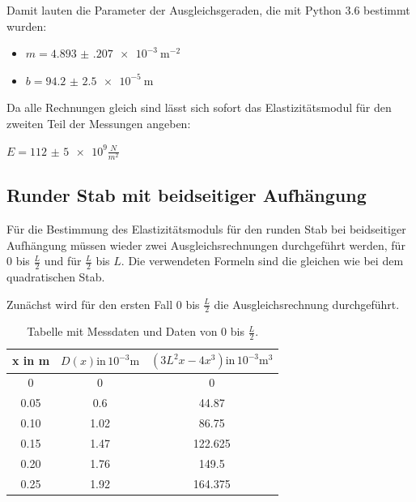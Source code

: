 Damit lauten die Parameter der Ausgleichsgeraden, die mit Python 3.6 bestimmt wurden:

\begin{itemize}
  \item $m = \SI{4.893(207)e-3}{\meter\tothe{-2}}$
  \item $b = \SI{94.2(25)e-5}{\meter}$
\end{itemize}


Da alle Rechnungen gleich sind lässt sich sofort das Elastizitätsmodul für den
zweiten Teil der Messungen angeben:\\

\centerline{$E = \num{112(5)e9} \frac{N}{m^2}$}


\subsection{Runder Stab mit beidseitiger Aufhängung}

Für die Bestimmung des Elastizitätsmoduls für den runden Stab bei beidseitiger
Aufhängung müssen wieder zwei Ausgleichsrechnungen durchgeführt werden, für
$0$ bis $\frac{L}{2}$ und für $\frac{L}{2}$ bis $L$. Die verwendeten Formeln sind
die gleichen wie bei dem quadratischen Stab.

Zunächst wird für den ersten Fall $0$ bis $\frac{L}{2}$ die Ausgleichsrechnung
durchgeführt.

\begin{table}
  \centering
  \caption{Tabelle mit Messdaten und Daten von $0$ bis $\frac{L}{2}$.}
  \begin{tabular}{c c c}
    \toprule
    x in \si{\meter} & $D(x) \text{in} \, 10^{-3} \si{\meter}$ &
    $ \left( 3L^2x-4x^3 \right) \text{in} \, 10^{-3} \si{\meter\tothe{3}}$\\
    \midrule
    0    & 0    &  0 \\
    0.05 & 0.6 & 44.87 \\
    0.10 & 1.02 &  86.75 \\
    0.15 & 1.47 &  122.625 \\
    0.20 & 1.76 &  149.5 \\
    0.25 & 1.92 &  164.375 \\
    \bottomrule
  \end{tabular}
\end{table}

